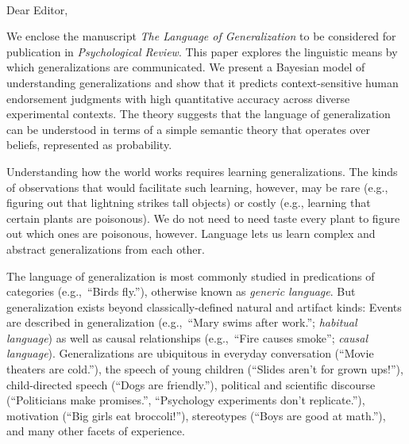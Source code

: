 \documentclass[11pt,letterpaper]{letter} %
\def\opening#1{\thispagestyle{empty}
{\centering\fromaddress \vspace{0.6in} \\ %
\hspace*{\longindentation}\hspace*{\fill}\par} %
\vspace{0.4in} %
\noindent #1 %
}
\begin{document}
\begin{letter}

\opening{Dear Editor,}

We enclose the manuscript \emph{The Language of Generalization} to be considered for publication in \emph{Psychological Review}. 
This paper explores the linguistic means by which generalizations are communicated.  
We present a Bayesian model of understanding generalizations and show that it predicts context-sensitive human endorsement judgments with high quantitative accuracy across diverse experimental contexts.
The theory suggests that the language of generalization can be understood in terms of a simple semantic theory that operates over beliefs, represented as probability.

Understanding how the world works requires learning generalizations. 
The kinds of observations that would facilitate such learning, however, may be rare (e.g., figuring out that lightning strikes tall objects) or costly (e.g., learning that certain plants are poisonous).
We do not need to need taste every plant to figure out which ones are poisonous, however.
Language lets us learn complex and abstract generalizations from each other.

The language of generalization is most commonly studied in predications of categories (e.g.,~``Birds fly.''), otherwise known as \emph{generic language}.
But generalization exists beyond classically-defined natural and artifact kinds: Events are described in generalization (e.g.,~``Mary swims after work.''; \emph{habitual language}) as well as causal relationships (e.g.,~``Fire causes smoke''; \emph{causal language}).
Generalizations are ubiquitous in everyday conversation (``Movie theaters are cold.''), the speech of young children (``Slides aren't for grown ups!''), child-directed speech (``Dogs are friendly.''), political and scientific discourse (``Politicians make promises.'', ``Psychology experiments don't replicate.''), motivation (``Big girls eat broccoli!''), stereotypes (``Boys are good at math.''), and many other facets of experience.



\end{letter}
\end{document}
